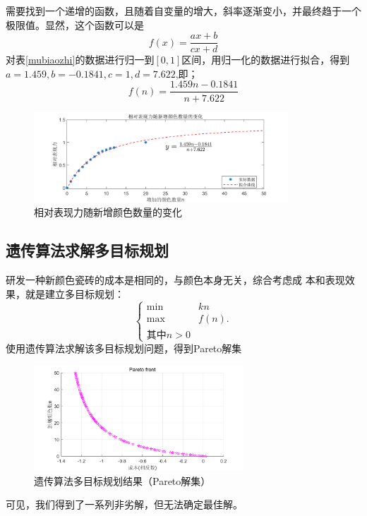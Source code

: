 \documentclass{article}
\begin{document}
 需要找到一个递增的函数，且随着自变量的增大，斜率逐渐变小，并最终趋于一个极限值。显然，这个函数可以是
   \begin{equation}
  f(x)=\frac{a x + b}{c x + d}
 \end{equation}
 对表\ref{mubiaozhi}的数据进行归一到$[0,1]$区间，用归一化的数据进行拟合，得到$a=1.459,b=-0.1841,c=1,d=7.622$,即；
    \begin{equation}
 f(n)=\frac{1.459 n -0.1841}{ n + 7.622}
 \end{equation}
    \begin{figure}[H]
 	\centering
 	\includegraphics[width=0.85\textwidth]{img/相对表现力随新增颜色数量的变化.png}
 	\caption{相对表现力随新增颜色数量的变化}
 	\label{相对表现力随新增颜色数量的变化}
 \end{figure}
 \subsection{遗传算法求解多目标规划}
 研发一种新颜色瓷砖的成本是相同的，与颜色本身无关，综合考虑成
 本和表现效果，就是建立多目标规划：
 \begin{equation}
 \left\{\begin{array}{ll}
 \min & k n \\
 \max & f(n) .\\
 \text{其中}n > 0
 \end{array}\right.
 \label{dmb}
 \end{equation}
 使用遗传算法求解该多目标规划问题，得到Pareto解集
     \begin{figure}[H]
 	\centering
 	\includegraphics[width=0.7\textwidth]{img/遗传算法多目标规划结果.png}
 	\caption{遗传算法多目标规划结果（Pareto解集）}
 	\label{遗传算法多目标规划结果}
 \end{figure}
可见，我们得到了一系列非劣解，但无法确定最佳解。
\end{document}
